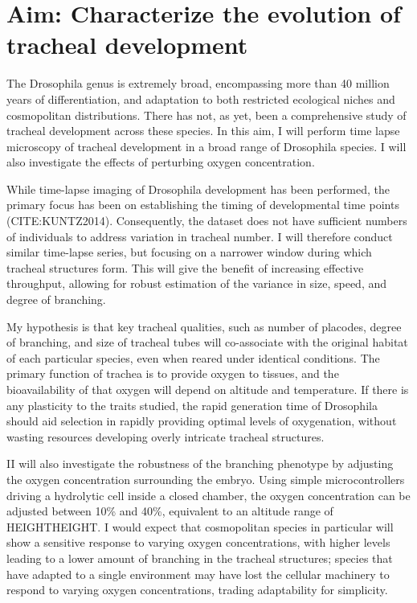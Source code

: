 \documentclass{proposal}
\begin{document}
\section{Aim: Characterize the evolution of tracheal development}

The Drosophila genus is extremely broad, encompassing more than 40 million years of differentiation, and adaptation to both restricted ecological niches and cosmopolitan distributions. There has not, as yet, been a comprehensive study of tracheal development across these species.  In this aim, I will perform time lapse microscopy of tracheal development in a broad range of Drosophila species.  I will also investigate the effects of perturbing oxygen concentration.

While time-lapse imaging of Drosophila development has been performed, the primary focus has been on establishing the timing of developmental time points (CITE:KUNTZ2014).  Consequently, the dataset does not have sufficient numbers of individuals to address variation in tracheal number.  I will therefore conduct similar time-lapse series, but focusing on a narrower window during which tracheal structures form.  This will give the benefit of increasing effective throughput, allowing for robust estimation of the variance in size, speed, and degree of branching. 

My hypothesis is that key tracheal qualities, such as number of placodes, degree of branching, and size of tracheal tubes will co-associate with the original habitat of each particular species, even when reared under identical conditions.  The primary function of trachea is to provide oxygen to tissues, and the bioavailability of that oxygen will depend on altitude and temperature. If there is any plasticity to the traits studied, the rapid generation time of Drosophila should aid selection in rapidly providing optimal levels of oxygenation, without wasting resources developing overly intricate tracheal structures. 

II will also investigate the robustness of the branching phenotype by adjusting the oxygen concentration surrounding the embryo.  Using simple microcontrollers driving a hydrolytic cell inside a closed chamber, the oxygen concentration can be adjusted between 10\% and 40\%, equivalent to an altitude range of HEIGHTHEIGHT.  I would expect that cosmopolitan species in particular will show a sensitive response to varying oxygen concentrations, with higher levels leading to a lower amount of branching in the tracheal structures; species that have adapted to a single environment may have lost the cellular machinery to respond to varying oxygen concentrations, trading adaptability for simplicity. 
\end{document}
